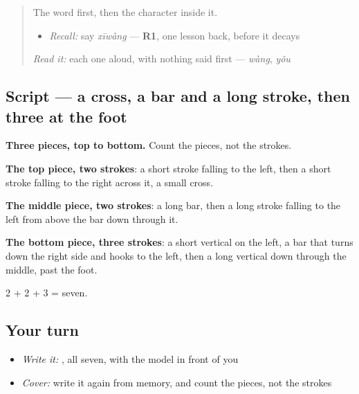 \begin{quote}
The word first, then the character inside it.

\begin{itemize}
\raggedright
  \item \emph{Recall:} say \emph{xīwàng} — \textbf{R1}, one lesson back, before it decays
\end{itemize}

\begin{quote}
 
\end{quote}

\emph{Read it:} each one aloud, with nothing said first — \emph{wàng}, \emph{yǒu}
\end{quote}

\subsection*{Script — a cross, a bar and a long stroke, then three at the foot}

\begin{quote}
\end{quote}

\textbf{Three pieces, top to bottom.} Count the pieces, not the strokes.

\textbf{The top piece, two strokes}: a short stroke falling to the left, then a short stroke falling to the right across it, a small cross.

\textbf{The middle piece, two strokes}: a long bar, then a long stroke falling to the left from above the bar down through it.

\textbf{The bottom piece, three strokes}: a short vertical on the left, a bar that turns down the right side and hooks to the left, then a long vertical down through the middle, past the foot.

2 + 2 + 3 = seven.

\subsection*{Your turn}
\begin{itemize}
\raggedright
  \item \emph{Write it:} , all seven, with the model in front of you
  \item \emph{Cover:} write it again from memory, and count the pieces, not the strokes
\end{itemize}


